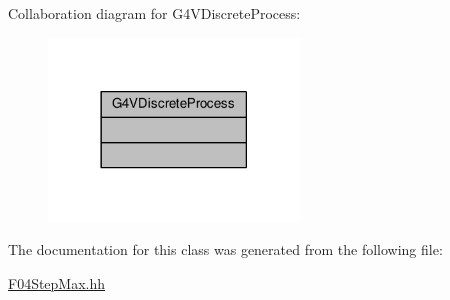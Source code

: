 Collaboration diagram for G4\+V\+Discrete\+Process\+:
\nopagebreak
\begin{figure}[H]
\begin{center}
\leavevmode
\includegraphics[width=189pt]{classG4VDiscreteProcess__coll__graph}
\end{center}
\end{figure}


The documentation for this class was generated from the following file\+:\begin{DoxyCompactItemize}
\item 
\hyperlink{F04StepMax_8hh}{F04\+Step\+Max.\+hh}\end{DoxyCompactItemize}
